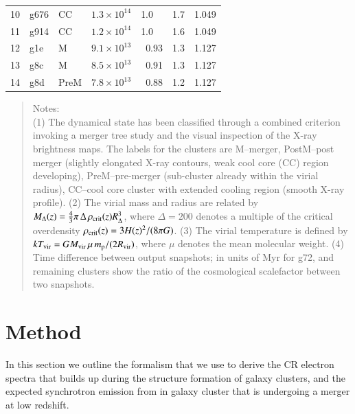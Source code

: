 \documentclass[useAMS,usenatbib]{mn2e}
\newcommand{\p}{\mathrm{p}}
\begin{document}
\begin{table}
\begin{tabular}{l l l l r r r}
10 & g676 & CC    & $1.3\times 10^{14}$ &   1.0~~ & 1.7  & 1.049 \\
11 & g914 & CC    & $1.2\times 10^{14}$ &   1.0~~ & 1.6  & 1.049 \\
12 & g1e  & M     & $9.1\times 10^{13}$ &  0.93   & 1.3  & 1.127 \\
13 & g8c  & M     & $8.5\times 10^{13}$ &  0.91   & 1.3  & 1.127 \\
14 & g8d  & PreM  & $7.8\times 10^{13}$ &  0.88   & 1.2  & 1.127 \\
\hline
\end{tabular}  \begin{quote}
 Notes:\\ (1) The dynamical state has been classified through a combined
 criterion invoking a merger tree study and the visual inspection of the X-ray
 brightness maps. The labels for the clusters are M--merger, PostM--post
 merger (slightly elongated X-ray contours, weak cool core (CC) region developing),
 PreM--pre-merger (sub-cluster already within the virial radius), CC--cool
 core cluster with extended cooling region (smooth X-ray profile).  (2) The
 virial mass and radius are related by $M_\Delta(z) = \frac{4}{3} \pi\,
 \Delta\, \rho_{\mathrm{crit}}(z) R_\Delta^3 $, where $\Delta=200$ denotes a
 multiple of the critical overdensity $\rho_{\mathrm{crit}}(z) = 3 H (z)^2/ (8\pi
 G)$.  (3) The virial temperature is defined by $kT_{\rm vir} = G M_{\rm vir} \,
 \mu\, m_\p / (2 R_{\rm vir})$, where $\mu$ denotes the mean molecular weight.
 (4) Time difference between output snapshots; in units of Myr for g72, and 
 remaining clusters show the ratio of the cosmological scalefactor between 
 two snapshots.
\end{quote}
\label{tab:cluster_sample}
\end{table}

\section{Method}
In this section we outline the formalism that we use to derive the CR
electron spectra that builds up during the structure formation of
galaxy clusters, and the expected synchrotron emission from in galaxy
cluster that is undergoing a merger at low redshift.
\end{document}
